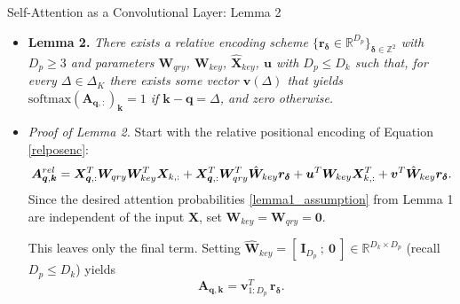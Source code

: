 \documentclass[9pt]{beamer}
\newcommand{\bb}{\mathbb}
\newcommand{\mb}{\bm}
\begin{document}
\newcommand{\brac}[1]{^{(#1)}}
\begin{frame}{Self-Attention as a Convolutional Layer: Lemma 2}
\begin{itemize}
\item \textbf{Lemma 2.} {\em There exists a relative encoding scheme $\{\bm r_{\bm \delta} \in \bb R^{D_p}\}_{\bm \delta\in\bb Z^2}$ with $D_p\geq 3$ and parameters $\bm W_{qry}$, $\bm W_{key}$, $\hat{\bm X}_{key}$, $\bm u$ with $D_p\leq D_k$ such that, for every $\bm\varDelta \in \Delta_K$ there exists some vector $\bm v(\bm\varDelta)$ that yields $\mathrm{softmax}(\bm A_{\bm q,:})_{\bm k}=1$ if $\bm k - \bm q = \bm\varDelta$, and zero otherwise.}

\vspace{.1in}
\item \textit{Proof of Lemma 2.} Start with the relative positional encoding of Equation \eqref{relposenc}:
\begin{equation*}
    \mb A^{rel}_{\mb q, \mb k} = 
        \mb X_{\mb q,:}^T \WW \mb X_{k,:}
        + \mb X_{\mb q,:}^T \mb W_{qry}^T\hat{\mb W}_{key} \mb r_{\mb \delta}
        + \mb u^T \mb W_{key} \mb X^T_{k,:}
        + \mb v^T \hat{\mb W}_{key} \mb r_{\bm\delta}.
\end{equation*}
Since the desired attention probabilities \eqref{lemma1_assumption} from Lemma 1 are independent of the input $\bm X$, set $\bm W_{key}=\bm W_{qry} = \bm 0$. 

\vspace{.1in}
This leaves only the final term. Setting $\hat{\bm W}_{key} = [\ \bm I_{D_p}\ ; \ \bm 0\ ] \in \mathbb R^{D_k\times D_p}$ (recall $D_p\leq D_k$) yields
\begin{equation*}
\mb A_{\mb q, \mb k} = \mb v_{1:D_p}^T\, \mb r_{\bm\delta}.
\end{equation*}
\end{itemize}
\end{frame}
\end{document}
